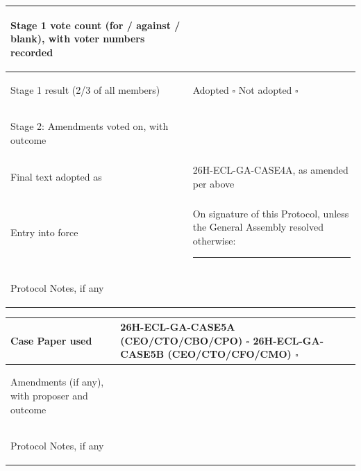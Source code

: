 \documentclass{../../../Common/Latex/Templates/rapport}
\begin{document}
\begin{tabularx}{\textwidth}{|>{\bfseries\raggedright\arraybackslash}p{5cm}|X|}
  \hline
  Stage 1 vote count (for / against / blank), with voter numbers recorded & \rule{0pt}{0.9cm}                                                                                                 \\
  \hline
  Stage 1 result (2/3 of all members)                                     & \rule{0pt}{0.9cm}Adopted \quad $\square$ \quad\quad Not adopted \quad $\square$                                   \\
  \hline
  Stage 2: Amendments voted on, with outcome                              & \rule{0pt}{1.8cm}                                                                                                 \\
  \hline
  Final text adopted as                                                   & \rule{0pt}{0.9cm}26H-ECL-GA-CASE4A, as amended per above                                                          \\
  \hline
  Entry into force                                                        & \rule{0pt}{0.9cm}On signature of this Protocol, unless the General Assembly resolved otherwise: \rule{2cm}{0.4pt} \\
  \hline
  Protocol Notes, if any                                                  & \rule{0pt}{1.2cm}                                                                                                 \\
  \hline
\end{tabularx}

\begin{tabularx}{\textwidth}{|>{\bfseries\raggedright\arraybackslash}p{5cm}|X|}
  \hline
  Case Paper used                                & \rule{0pt}{0.9cm}26H-ECL-GA-CASE5A (CEO/CTO/CBO/CPO) \quad $\square$ \quad\quad 26H-ECL-GA-CASE5B (CEO/CTO/CFO/CMO) \quad $\square$ \\
  \hline
  Amendments (if any), with proposer and outcome & \rule{0pt}{1.2cm}                                                                                                                   \\
  \hline
  Protocol Notes, if any                         & \rule{0pt}{1.2cm}                                                                                                                   \\
  \hline
\end{tabularx}
\end{document}
